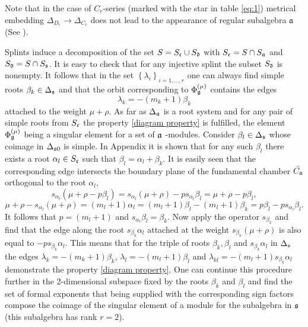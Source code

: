 \documentclass[12pt]{article}
\begin{document}
Note that in the case of $C_{r}$-series (marked with the star in table \eqref{eq:1}) metrical embedding $\Delta_{D_{r}}\to \Delta_{C_{r}}$ does not lead to the appearance of regular subalgebra $\mathfrak{a}$ (See \cite{dynkin1952semisimple}). 

Splints induce a decomposition of the set $S=S_{\frak{c}}\cup S_{\frak{d}}$
with $S_{\frak{c}}=S\cap S_{\frak{a}}$ and $S_{\frak{d}}=S\cap S_{\frak{s}}$. 
It is easy to check that for any injective splint the subset $S_{%
\frak{d}}$ is nonempty. It follows that in the set $\left\{ \lambda
_{i}\right\} _{i=1,\dots ,r}$ one can always find simple roots $\beta
_{k}\in \Delta _{\frak{s}}$ and that the orbit corresponding to $\Phi _{%
\frak{g}}^{\left( \mu \right) }$ contains the edges
\begin{equation}
\lambda _{k}=-\left( m_{k}+1\right) \beta _{k}  \label{beta edge}
\end{equation}
attached to the weight $\mu +\rho $. As far as $\Delta _{\frak{a}}$ is a
root system and for any pair of simple roots from $S_{\frak{c}}$ the
property \ref{diagram property} is fulfilled, the element $\Phi _{\frak{g}%
}^{\left( \mu \right) }$ being a singular element for a set of $\frak{a}$%
-modules. Consider $\beta _{l}\in \Delta _{\frak{s}}$ whose coimage in $%
\Delta _{\frak{s}0}$ is simple. In Appendix it is shown that for any such $%
\beta _{l}$ there exists a root $\alpha _{l}\in S_{\frak{c}}$ such that
$\beta _{l}=\alpha _{l}+\beta _{k}$. It is easily seen that the
corresponding edge intersects the boundary plane of the fundamental chamber $%
\bar{C_{\frak{a}}}$ orthogonal to the root $\alpha _{l}$,
\begin{equation}
s_{\alpha _{l}}\left( \mu +\rho -p\beta _{l}\right) =s_{\alpha _{l}}\left(
\mu +\rho \right) -ps_{\alpha _{l}}\beta _{l}=\mu +\rho -p\beta _{l},
\label{intersection}
\end{equation}
\begin{equation}
\mu +\rho -s_{\alpha _{l}}\left( \mu +\rho \right) =\left( m_{l}+1\right)
\alpha _{l}=\left( m_{l}+1\right) \beta _{l}-\left( m_{l}+1\right) \beta
_{k}=p\beta _{l}-ps_{\alpha _{l}}\beta _{l}.  
\label{intersection-2}
\end{equation}
It follows that $p=\left( m_{l}+1\right) $ and $s_{\alpha _{l}}\beta
_{l}=\beta _{k}$. Now apply the operator $s_{\beta _{k}}$ and find that the
edge along the root $s_{\beta _{k}}\alpha _{l}$ attached at the weight $%
s_{\beta _{k}}(\mu +\rho )$ is also equal to $-ps_{\beta _{k}}\alpha _{l}$.
This means that for the triple of roots $\beta _{k},\beta _{l}$ and $%
s_{\beta _{k}}\alpha _{l}$ in $\Delta _{\frak{s}}$ the edges $\lambda
_{k}=-\left( m_{k}+1\right) \beta _{k}$, $\lambda _{l}=-\left(
m_{l}+1\right) \beta _{l}$ and $\lambda _{kl}=-\left( m_{l}+1\right)
s_{\beta _{k}}\alpha _{l}$ demonstrate the property \ref{diagram property}.
One can continue this procedure further in the 2-dimensional subspace fixed
by the roots $\beta _{k}$ and $\beta _{l}$ and find the set of formal
exponents that being supplied with the corresponding sign factors compose
the coimage of the singular element of a module for the subalgebra in $\frak{%
s}$ (this subalgebra has rank $r=2$).
\end{document}
